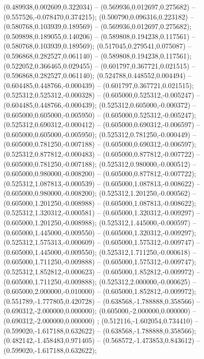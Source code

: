  (0.489938,0.002609,0.322034) -- (0.569936,0.012697,0.275682) -- (0.557526,-0.078470,0.374215);
 (0.500790,0.096316,0.223182) -- (0.580768,0.103939,0.189569) -- (0.569936,0.012697,0.275682);
 (0.509898,0.189055,0.140206) -- (0.589808,0.194238,0.117561) -- (0.580768,0.103939,0.189569);
 (0.517045,0.279541,0.075087) -- (0.596868,0.282527,0.061140) -- (0.589808,0.194238,0.117561);
 (0.522052,0.366465,0.029455) -- (0.601797,0.367721,0.021515) -- (0.596868,0.282527,0.061140);
 (0.524788,0.448552,0.004494) -- (0.604485,0.448766,-0.000439) -- (0.601797,0.367721,0.021515);
 (0.525312,0.525312,-0.000328) -- (0.605000,0.525312,-0.005247) -- (0.604485,0.448766,-0.000439);
 (0.525312,0.605000,-0.000372) -- (0.605000,0.605000,-0.005950) -- (0.605000,0.525312,-0.005247);
 (0.525312,0.690312,-0.000412) -- (0.605000,0.690312,-0.006597) -- (0.605000,0.605000,-0.005950);
 (0.525312,0.781250,-0.000449) -- (0.605000,0.781250,-0.007188) -- (0.605000,0.690312,-0.006597);
 (0.525312,0.877812,-0.000483) -- (0.605000,0.877812,-0.007722) -- (0.605000,0.781250,-0.007188);
 (0.525312,0.980000,-0.000512) -- (0.605000,0.980000,-0.008200) -- (0.605000,0.877812,-0.007722);
 (0.525312,1.087813,-0.000539) -- (0.605000,1.087813,-0.008622) -- (0.605000,0.980000,-0.008200);
 (0.525312,1.201250,-0.000562) -- (0.605000,1.201250,-0.008988) -- (0.605000,1.087813,-0.008622);
 (0.525312,1.320312,-0.000581) -- (0.605000,1.320312,-0.009297) -- (0.605000,1.201250,-0.008988);
 (0.525312,1.445000,-0.000597) -- (0.605000,1.445000,-0.009550) -- (0.605000,1.320312,-0.009297);
 (0.525312,1.575313,-0.000609) -- (0.605000,1.575312,-0.009747) -- (0.605000,1.445000,-0.009550);
 (0.525312,1.711250,-0.000618) -- (0.605000,1.711250,-0.009888) -- (0.605000,1.575312,-0.009747);
 (0.525312,1.852812,-0.000623) -- (0.605000,1.852812,-0.009972) -- (0.605000,1.711250,-0.009888);
 (0.525312,2.000000,-0.000625) -- (0.605000,2.000000,-0.010000) -- (0.605000,1.852812,-0.009972);
 (0.551789,-1.777805,0.420728) -- (0.638568,-1.788888,0.358566) -- (0.690312,-2.000000,0.000000);
 (0.605000,-2.000000,0.000000) -- (0.690312,-2.000000,0.000000) ;
 (0.512116,-1.602054,0.734410) -- (0.599020,-1.617188,0.632622) -- (0.638568,-1.788888,0.358566);
 (0.482142,-1.458483,0.971405) -- (0.568572,-1.473853,0.843612) -- (0.599020,-1.617188,0.632622);
